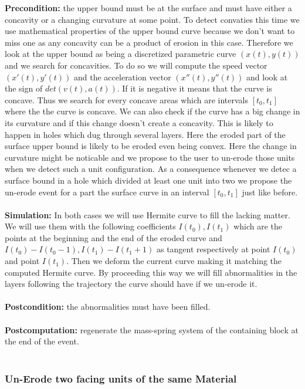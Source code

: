 \documentclass[12pt, a4paper]{report} %
\begin{document}
\textbf{Precondition:} the upper bound must be at the surface and must have either a concavity or a changing curvature at some point. To detect convaties this time we use mathematical properties of the upper bound curve because we don't want to miss one as any concavity can be a product of erosion in this case. Therefore we look at the upper bound as being a discretized parametric curve $(x(t),y(t))$ and we search for concavities. To do so we will compute the speed vector $(x'(t),y'(t))$ and the acceleration vector $(x''(t),y''(t))$ and look at the sign of $det(v(t),a(t))$. If it is negative it means that the curve is concave. Thus we search for every concave areas which are intervals $[t_0,t_1]$ where the the curve is concave. We can also check if the curve has a big change in its curvature and if this change doesn't create a concavity. This is likely to happen  in holes which dug through several layers. Here the eroded part of the surface upper bound is likely to be eroded even being convex. Here the change in curvature might be noticable and we propose to the user to un-erode those units when we detect such a unit configuration. As a consequence whenever we detec a surface bound in a hole which divided at least one unit into two we propose the un-erode event for a part the surface curve in an interval $[t_0,t_1]$ just like before.\\\\
\textbf{Simulation:} In both cases we will use Hermite curve to fill the lacking matter. We will use them with the following coefficients $I(t_0), I(t_1)$ which are the points at the beginning and the end of the eroded curve and $I(t_0) - I(t_0 - 1), I(t_1) - I(t_1 + 1)$  as tangent respectively at point $I(t_0)$ and point $I(t_1)$. Then we deform the current curve making it matching the computed Hermite curve. By proceeding this way we will fill abnormalities in the layers following the trajectory the curve should have if we un-erode it.\\\\
\textbf{Postcondition:} the abnormalities must have been filled.\\\\
\textbf{Postcomputation:} regenerate the mass-spring system of the containing block at the end of the event.\\\\

\subsubsection{Un-Erode two facing units of the same Material}
\end{document}
